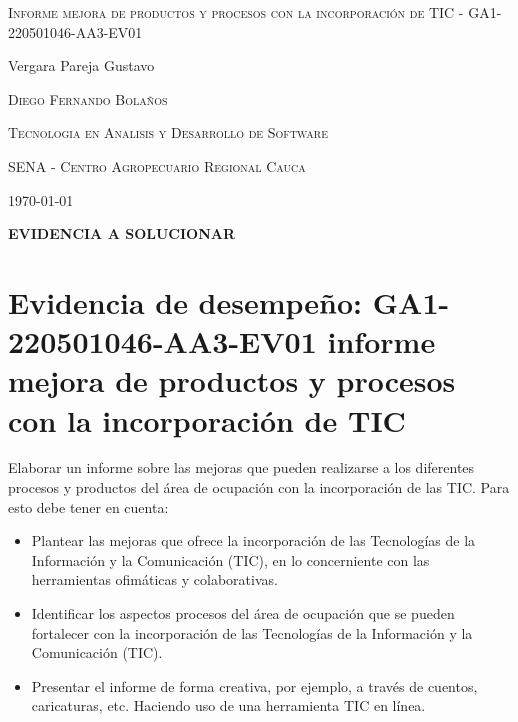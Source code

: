 \documentclass{article}
\author{Gustavo Vergara}
\theoremstyle{mytheoremstyle}
\theoremstyle{mytheoremstyle}
\theoremstyle{myproblemstyle}
\begin{document}
\begin{titlepage}
    \centering
    
    
    \vspace{3cm}
    {\scshape \Large Informe mejora de productos y procesos con la incorporación de TIC - GA1-220501046-AA3-EV01 \par}
    \vspace{7cm}
    \textbf\large\scshape{\par}
         \vspace{0.5cm}
         
    {\Large Vergara Pareja Gustavo\par}
    \vspace{7cm}
    {\scshape\Large Diego Fernando Bolaños\par}
    \vspace{1cm}
    {\scshape\Large Tecnologia en Analisis y Desarrollo de Software \par}
    \vspace{1cm}
    {\scshape\Large SENA - Centro Agropecuario Regional Cauca\par}
    \vspace{1cm}
    {\Large \today \par}
    \end{titlepage}

 

\newpage

\begin{flushleft}
    \large \textbf{EVIDENCIA A SOLUCIONAR}\\
    \vspace{1cm}
    
    \section*{Evidencia de desempeño: GA1-220501046-AA3-EV01 informe mejora de productos y procesos con la incorporación de TIC}
    Elaborar un informe sobre las mejoras que pueden realizarse a los diferentes procesos y productos del área de ocupación con la incorporación de las TIC. Para esto debe tener en cuenta:
    \begin{itemize}
    \item Plantear las mejoras que ofrece la incorporación de las Tecnologías de la Información y la Comunicación (TIC), en lo concerniente con las herramientas ofimáticas y colaborativas.
    \item Identificar los aspectos procesos del área de ocupación que se pueden fortalecer con la incorporación de las Tecnologías de la Información y la Comunicación (TIC).
    \item Presentar el informe de forma creativa, por ejemplo, a través de cuentos, caricaturas, etc. Haciendo uso de una herramienta TIC en línea.
    \end{itemize}
    \end{flushleft}
    \newpage
    \tableofcontents
    
\end{document}
